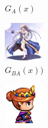 \documentclass[twocolumn,11pt]{ctexart}
\begin{document}
\begin{figure}[htb]
\begin{subfigure}[b]{0.23\linewidth}
        \caption{$G_A(x)$}
      \end{subfigure}
      \begin{subfigure}[b]{0.23\linewidth}
        \includegraphics[width=\linewidth]{exp3_epoch194_rec_A.png}
        \caption{$G_{BA}(x))$}
      \end{subfigure}
      \begin{subfigure}[b]{0.23\linewidth}
        \includegraphics[width=\linewidth]{exp3_epoch194_idt_A.png}

\end{subfigure}
\end{figure}
\end{document}
